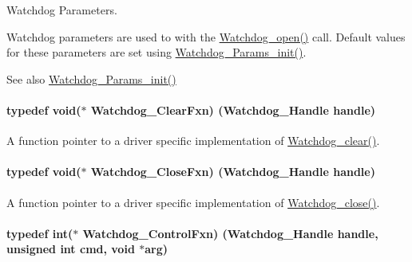 Watchdog Parameters. 

Watchdog parameters are used to with the \hyperlink{_watchdog_8h_aa5ce656aa6d5199e1efdb4ca2cd9fb7c}{Watchdog\+\_\+open()} call. Default values for these parameters are set using \hyperlink{_watchdog_8h_a6a6f54cfdac33d3bf33464a212262afc}{Watchdog\+\_\+\+Params\+\_\+init()}.

\begin{DoxySeeAlso}{See also}
\hyperlink{_watchdog_8h_a6a6f54cfdac33d3bf33464a212262afc}{Watchdog\+\_\+\+Params\+\_\+init()} 
\end{DoxySeeAlso}
\paragraph[{Watchdog\+\_\+\+Clear\+Fxn}]{\setlength{\rightskip}{0pt plus 5cm}typedef void($\ast$ Watchdog\+\_\+\+Clear\+Fxn) ({\bf Watchdog\+\_\+\+Handle} handle)}\label{_watchdog_8h_a0315c4931ba68423472f47c23c86f296}


A function pointer to a driver specific implementation of \hyperlink{_watchdog_8h_a396decd6b1807db10c636f9987c3be4c}{Watchdog\+\_\+clear()}. 

\paragraph[{Watchdog\+\_\+\+Close\+Fxn}]{\setlength{\rightskip}{0pt plus 5cm}typedef void($\ast$ Watchdog\+\_\+\+Close\+Fxn) ({\bf Watchdog\+\_\+\+Handle} handle)}\label{_watchdog_8h_a2d13686bc3dd7fdb05ec97d63be489ee}


A function pointer to a driver specific implementation of \hyperlink{_watchdog_8h_a1c0dfea7011b06f303d01afb631ffbdd}{Watchdog\+\_\+close()}. 

\paragraph[{Watchdog\+\_\+\+Control\+Fxn}]{\setlength{\rightskip}{0pt plus 5cm}typedef int($\ast$ Watchdog\+\_\+\+Control\+Fxn) ({\bf Watchdog\+\_\+\+Handle} handle, unsigned int cmd, void $\ast$arg)}\label{_watchdog_8h_afb5bd0153345db8f4a7a6a8756b90447}


